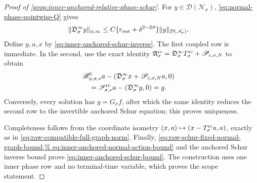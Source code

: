 \begin{proof}[Proof of
\cref{prop:inner-anchored-relative-phase-schur}]
For \(y\in\mathcal D(\mathscr N_\sigma)\),
\cref{eq:normal-phase-pointwise-Q} gives
\begin{equation}
 \|\mathfrak D_\sigma^\infty y\|_{\phi,\infty}
 \le C\{r_{\rm out}+\delta^{2-2\vartheta}\}
       \|y\|_{\mathcal D(\mathscr N_\sigma)}.      \label{eq:inner-anchored-normal-action-bound}
\end{equation}
Define \(y,a,x\) by \cref{eq:inner-anchored-schur-inverse}.  The first
coupled row is immediate.  In the second, use the exact identity
\(\mathfrak A_\sigma^{\rm rc}
 =\mathfrak D_\sigma^\infty T_\sigma^{\rm rc}
      +\mathscr P_{c,\sigma,N}\) to obtain
\begin{align*}
 &\mathscr B_{\phi,\sigma,*}^0a
 -(\mathfrak D_\sigma^\infty x
       +\mathscr P_{c,\sigma,N}a,0)\\
 &\quad
 =\mathscr S_{\sigma,*}^{\rm rc}a
       -(\mathfrak D_\sigma^\infty y,0)=g.
\end{align*}
Conversely, every solution has \(y=G_\sigma f\), after which the same
identity reduces the second row to the invertible anchored Schur equation;
this proves uniqueness.

Completeness follows from the coordinate isometry
\((x,a)\mapsto(x-T_\sigma^{\rm rc}a,a)\), exactly as in
\cref{eq:raw-compatible-full-graph-norm}.  Finally,
\cref{eq:raw-schur-fixed-normal-graph-bound,%
eq:inner-anchored-normal-action-bound} and the anchored Schur inverse
bound prove \cref{eq:inner-anchored-schur-bound}.  The construction uses
one inner phase row and no terminal-time variable, which proves the scope
statement.
\end{proof}

